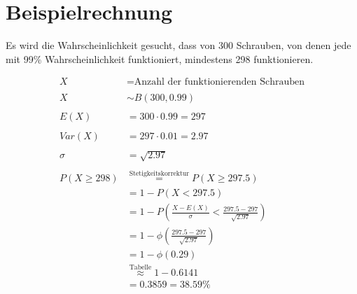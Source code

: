 \section{Beispielrechnung}
Es wird die Wahrscheinlichkeit gesucht, dass von 300 Schrauben, von denen jede mit 99\% Wahrscheinlichkeit funktioniert, mindestens 298 funktionieren.

\begin{align*}
    X &= \text{Anzahl der funktionierenden Schrauben} \\\\
    X &\sim B(300, 0.99) \\\\
    E(X) &= 300 \cdot 0.99 = 297 \\\\
    Var(X) &= 297 \cdot 0.01 = 2.97 \\\\
    \sigma &= \sqrt{2.97} \\\\
    P(X \ge 298) &\overset{\text{Stetigkeitskorrektur}}{=} P(X \ge 297.5) \\
    &= 1 - P(X < 297.5) \\
    &= 1 - P\left(\frac{X - E(X)}{\sigma} < \frac{297.5 - 297}{\sqrt{2.97}}\right) \\
    &= 1 - \phi\left(\frac{297.5 - 297}{\sqrt{2.97}}\right) \\
    &= 1 - \phi(0.29) \\
    &\overset{\text{Tabelle}}{\approx} 1 - 0.6141 \\
    &= 0.3859 = 38.59\%
\end{align*}